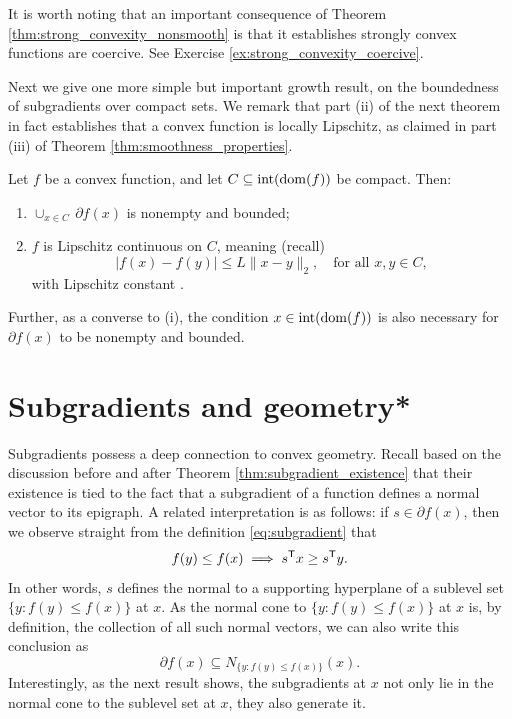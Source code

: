 It is worth noting that an important consequence of Theorem
\ref{thm:strong_convexity_nonsmooth} is that it establishes strongly convex
functions are coercive. See Exercise \ref{ex:strong_convexity_coercive}.

Next we give one more simple but important growth result, on the boundedness of
subgradients over compact sets. We remark that part (ii) of the next theorem in
fact establishes that a convex function is locally Lipschitz, as claimed in part
(iii) of Theorem \ref{thm:smoothness_properties}.  

\begin{Theorem}
\label{thm:subgradient_boundedness}
Let $f$ be a convex function, and let $C \subseteq \operatorname{int}(\operatorname{dom}(f))$ be 
compact. Then:
\begin{enumerate}[label=(\roman*)]
\item $\cup_{x \in C} \, \partial f(x)$ is nonempty and bounded;  
\item $f$ is Lipschitz continuous on $C$, meaning (recall)
  \[
  |f(x) - f(y)| \leq L \|x-y\|_2, \quad \text{for all $x,y \in C$},
  \]
  with Lipschitz constant . 
\end{enumerate}
Further, as a converse to (i), the condition $x \in \operatorname{int}(\operatorname{dom}(f))$ is also 
necessary for $\partial f(x)$ to be nonempty and bounded.   
\end{Theorem}



\section{Subgradients and geometry*}

Subgradients possess a deep connection to convex geometry. Recall based on the
discussion before and after Theorem \ref{thm:subgradient_existence} that their
existence is tied to the fact that a subgradient of a function defines a normal
vector to its epigraph. A related interpretation is as follows: if $s \in
\partial f(x)$, then we observe straight from the definition
\eqref{eq:subgradient} that
\[
f(y) \leq f(x) \implies s^{\mathsf{T}} x \geq s^{\mathsf{T}} y.
\]
In other words, $s$ defines the normal to a supporting hyperplane of a sublevel
set $\{y : f(y) \leq f(x)\}$ at $x$. As the normal cone to $\{y : f(y) \leq
f(x)\}$ at $x$ is, by definition, the collection of all such normal vectors, we
can also write this conclusion as   
\[
\partial f(x) \subseteq N_{\{y : f(y) \leq f(x)\}}(x).
\]
Interestingly, as the next result shows, the subgradients at $x$ not only lie in
the normal cone to the sublevel set at $x$, they also generate it. 

